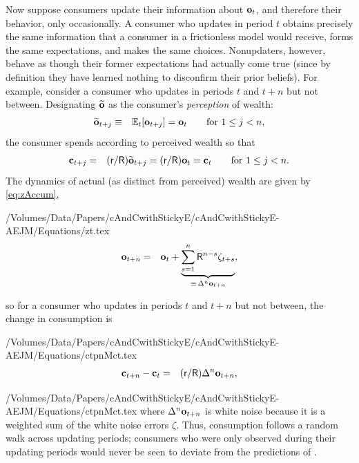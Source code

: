 Now suppose consumers update their information about $\mathbf{o}_t$, and therefore their behavior, only occasionally.  A consumer who updates in period $t$ obtains precisely the same information that a consumer in a frictionless model would receive, forms the same expectations, and makes the same choices.  Nonupdaters, however, behave as though their former expectations had actually come true (since by definition they have learned nothing to disconfirm their prior beliefs).  For example, consider a consumer who updates in periods $t$ and $t+n$ but not between.  Designating $\widetilde{\mathbf{o}}$ as the consumer's {\it perception} of wealth:
  \begin{eqnarray*}
\widetilde{\mathbf{o}}_{t+j} & \equiv & \operatorname{\mathbb{E}}_{t}[\mathbf{o}_{t+j}] = \mathbf{o}_{t} \qquad \text{for }  1\le j < n,
\end{eqnarray*}
  the consumer spends according to perceived wealth so that
  \begin{eqnarray*}
\mathbf{c}_{t+j} & = & (\mathsf{r}/\mathsf{R})\widetilde{\mathbf{o}}_{t+j} = (\mathsf{r}/\mathsf{R})     \mathbf{o} _{t} = \mathbf{c}_{t} \qquad \text{for }  1\le j < n.
\end{eqnarray*}
The dynamics of actual (as distinct from perceived) wealth are given by \eqref{eq:zAccum},
\begin{verbatimwrite}{/Volumes/Data/Papers/cAndCwithStickyE/cAndCwithStickyE-AEJM/Equations/zt.tex}
\begin{eqnarray*}
 \mathbf{o}_{t+n} & = & \mathbf{o}_{t}+\underbrace{\sum_{s=1}^{n} \mathsf{R}^{n-s}\zeta_{t+s}}_{\equiv\,\Delta^{n} \mathbf{o}_{t+n}},
\end{eqnarray*}
\end{verbatimwrite}

so for a consumer who updates in periods $t$ and $t+n$ but not between, the change in consumption is
\begin{verbatimwrite}{/Volumes/Data/Papers/cAndCwithStickyE/cAndCwithStickyE-AEJM/Equations/ctpnMct.tex}
\begin{eqnarray*}
         \mathbf{c}_{t+n}-\mathbf{c}_{t}  & = & (\mathsf{r}/\mathsf{R})\Delta^{n}\mathbf{o}_{t+n},
\end{eqnarray*}
\end{verbatimwrite}
 {/Volumes/Data/Papers/cAndCwithStickyE/cAndCwithStickyE-AEJM/Equations/ctpnMct.tex} where $\Delta^{n}\mathbf{o}_{t+n}$ is white noise because it is a weighted sum of the white noise errors $\zeta$.  Thus, consumption follows a random walk across updating periods; consumers who were only observed during their updating periods would never be seen to deviate from the predictions of \cite{hallRandomWalk}.


